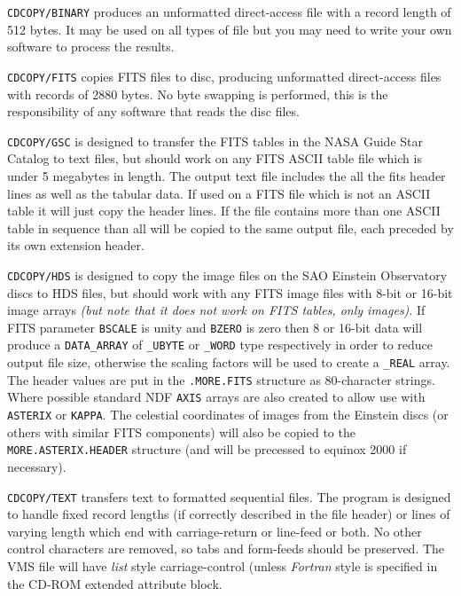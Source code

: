 \begin{description}
\item {\tt CDCOPY/BINARY} produces an unformatted direct-access file
with a record length of 512 bytes. It may be used on all types of file
but you may need to write your own software to process the results.

\item {\tt CDCOPY/FITS} copies FITS files to disc, producing unformatted
direct-access files with records of 2880 bytes.  No byte swapping is
performed, this is the responsibility of any software that reads the
disc files.

\item {\tt CDCOPY/GSC} is designed to transfer the FITS tables in the
NASA Guide Star Catalog to text files, but should work on any FITS ASCII
table file which is under 5 megabytes in length. The output text file
includes the all the fits header lines as well as the tabular data. If
used on a FITS file which is not an ASCII table it will just copy the
header lines.  If the file contains more than one ASCII table in
sequence than all will be copied to the same output file, each preceded
by its own extension header.

\item {\tt CDCOPY/HDS} is designed to copy the image files on the SAO
Einstein Observatory discs to HDS files, but should work with any FITS
image files with 8-bit or 16-bit image arrays {\em (but note that it does
not work on FITS tables, only images)}. If FITS parameter {\tt BSCALE}
is unity and {\tt BZERO} is zero then 8 or 16-bit data will produce a
{\tt DATA\_ARRAY} of {\tt \_UBYTE} or {\tt \_WORD} type respectively in
order to reduce output file size, otherwise the scaling factors will be
used to create a {\tt \_REAL} array.  The header values are put in the
{\tt .MORE.FITS} structure as 80-character strings.  Where possible
standard NDF {\tt AXIS} arrays are also created to allow use with {\tt
ASTERIX} or {\tt KAPPA}.  The celestial coordinates of images from the
Einstein discs (or others with similar FITS components) will also be
copied to the {\tt MORE.ASTERIX.HEADER} structure (and will be precessed
to equinox 2000 if necessary).

\item {\tt CDCOPY/TEXT} transfers text to formatted sequential files.
The program is designed to handle fixed record lengths (if
correctly described in the file header) or lines of varying length which
end with carriage-return or line-feed or both.  No other control
characters are removed, so tabs and form-feeds should be preserved. The
VMS file will have {\it list} style carriage-control (unless {\it
Fortran} style is specified in the CD-ROM extended attribute block.

\end{description}
